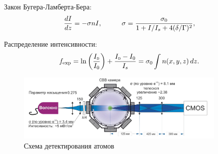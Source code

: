
\begin{minipage}{0.68\textwidth}
Закон Бугера-Ламберта-Бера:
\begin{equation*}
    \frac{d I}{d z} = - \sigma n I,
    \hspace{10 mm} 
    \sigma = \frac{\sigma_0}{1+I/I_s + 4 (\delta/\Gamma)^2},
\end{equation*}


Распределение интенсивности:
\begin{equation*}
    \sub{f}{exp} = \ln\left(\frac{\subt{I}{D}}{I_0}\right) + \frac{\subt{I}{D} - I_0}{I_s} = \sigma_0 \int n(x, y, z) \d z.
\end{equation*}

\begin{figure}[ht]
    \centering
    \includegraphics[width=0.9\textwidth]{../MOT/figs/detect.png}
    \caption{Схема детектирования атомов}
\end{figure}
\end{minipage}
\hfill
